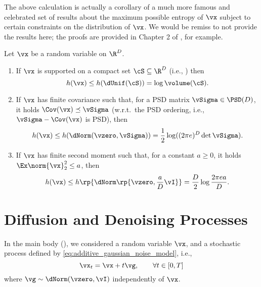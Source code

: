\documentclass[../../book-main.tex]{subfiles}
\begin{document}
The above calculation is actually a corollary of a much more famous and celebrated set of results about the maximum possible entropy of \(\vx\) subject to certain constraints on the distribution of \(\vx\). We would be remiss to not provide the results here; the proofs are provided in Chapter 2 of \cite{poliyanski2024information}, for example.
\begin{theorem}\label{thm:max_entropy}
    Let \(\vx\) be a random variable on \(\R^{D}\).
    \begin{enumerate}
        \item If \(\vx\) is supported on a compact set \(\cS \subseteq \R^{D}\) (i.e., ) then
        \begin{equation}
            h(\vx) \leq h(\dUnif(\cS)) = \log \volume(\cS).
        \end{equation}
        \item If \(\vx\) has finite covariance such that, for a PSD matrix \(\vSigma \in \PSD(D)\), it holds \(\Cov(\vx) \preceq \vSigma\) (w.r.t.~the PSD ordering, i.e., \(\vSigma - \Cov(\vx)\) is PSD), then
        \begin{equation}
            h(\vx) \leq h(\dNorm(\vzero, \vSigma)) = \frac{1}{2}\log((2\pi e)^{D}\det\vSigma).
        \end{equation}
        \item If \(\vx\) has finite second moment such that, for a constant \(a \geq 0\), it holds \(\Ex\norm{\vx}_{2}^{2} \leq a\), then
        \begin{equation}
            h(\vx) \leq h\rp{\dNorm\rp{\vzero, \frac{a}{D}\vI}} = \frac{D}{2}\log\frac{2\pi e a}{D}.
        \end{equation}
    \end{enumerate}
\end{theorem}


\section{Diffusion and Denoising Processes}\label{sec:entropy_diffusion}

In the main body (), we considered a random variable \(\vx\), and a stochastic process defined by \eqref{eq:additive_gaussian_noise_model}, i.e.,
\begin{equation}\label{eq:app_additive_gaussian_noise_model}
    \vx_{t} = \vx + t\vg, \qquad  \forall t \in [0, T]
\end{equation}
where \(\vg \sim \dNorm(\vzero, \vI)\) independently of \(\vx\). 
\end{document}
